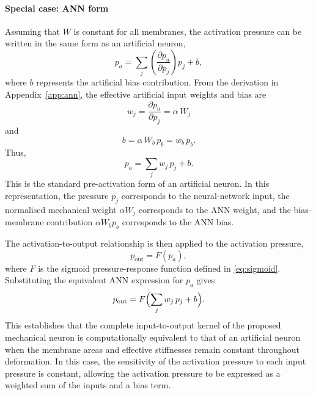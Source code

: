 \documentclass[11pt,a4paper]{article}
\numberwithin{equation}{section}
\newcommand{\pout}{p_{\mathrm{out}}}
\begin{document}
\paragraph{Special case: ANN form}

Assuming that $W$ is constant for all membranes, the activation pressure can be written in the same form as an
artificial neuron,
\begin{equation}
  p_a = \sum_j \left(\frac{\partial p_a}{\partial p_j}\right) p_j + b,
  \label{eq:ann-sensitivity-form}
\end{equation}
where $b$ represents the artificial bias contribution. From the derivation in Appendix~\ref{app:ann}, the effective
artificial input weights and bias are
\begin{equation}
  w_j = \frac{\partial p_a}{\partial p_j} = \alpha\,W_j
  \label{eq:ann-weight}
\end{equation}
and
\begin{equation}
  b = \alpha\,W_b\,p_b = w_b\,p_b .
  \label{eq:ann-bias}
\end{equation}
Thus,
\begin{equation}
  p_a = \sum_j w_j\,p_j + b .
  \label{eq:ann-preactivation}
\end{equation}
This is the standard pre-activation form of an artificial neuron. In this representation, the pressure $p_j$
corresponds to the neural-network input, the normalised mechanical weight $\alpha W_j$ corresponds to the ANN weight,
and the bias-membrane contribution $\alpha W_b p_b$ corresponds to the ANN bias.

The activation-to-output relationship is then applied to the activation pressure,
\begin{equation}
  \pout = F(p_a),
  \label{eq:af}
\end{equation}
where $F$ is the sigmoid pressure-response function defined in \cref{eq:sigmoid}. Substituting the equivalent ANN
expression for $p_a$ gives
\begin{equation}
  \pout = F\Bigl(\sum_j w_j\,p_j + b\Bigr) .
  \label{eq:ann-full}
\end{equation}
This establishes that the complete input-to-output kernel of the proposed mechanical neuron is computationally
equivalent to that of an artificial neuron when the membrane areas and effective stiffnesses remain constant
throughout deformation. In this case, the sensitivity of the activation pressure to each input pressure is constant,
allowing the activation pressure to be expressed as a weighted sum of the inputs and a bias term.
\end{document}
